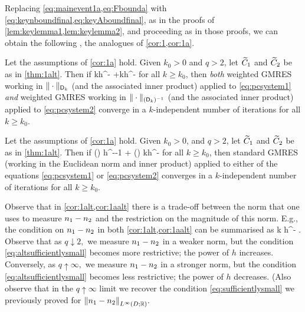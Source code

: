 Replacing \cref{eq:mainevent1a,eq:Fbounda} with \cref{eq:keynboundfinal,eq:keyAboundfinal}, as in the proofs of \cref{lem:keylemma1,lem:keylemma2}, and proceeding as in those proofs, we can obtain the following , the analogues of \cref{cor:1,cor:1a}.

\label{cor:1alt}
Let the assumptions of \cref{cor:1a} hold.  Given $k_0>0$ and $q >2$, let $\widetilde{C}_{1}$ and $\widetilde{C}_{2}$ be as in \cref{thm:1alt}. Then if 
\beq\label{eq:condalt}
\Cotilde kh^{-} \NLqDRRdtd{\Aso-\Ast} +\Cttilde  kh^{-} \NLqDRR{\nso-\nst}
\leq {}
\eeq
for all $k\geq k_0$, then \emph{both} weighted GMRES working in $\|\cdot\|_{\mathsf{D}_k}$ (and the associated inner product) applied to \cref{eq:pcsystem1} \emph{and} weighted GMRES working in $\|\cdot\|_{(\mathsf{D}_k)^{-1}}$ (and the associated inner product) applied to \cref{eq:pcsystem2}  converge in a $k$-independent number of iterations for all $k\geq k_0$.
\enth

\label{cor:1aalt}
Let the assumptions of \cref{cor:1a} hold.  Given $k_0>0$, and $q >2$, let $\widetilde{C}_{1}$ and $\widetilde{C}_{2}$ be as in \cref{thm:1alt}. Then if 
\beq\label{eq:condaalt}
\Cotilde \mleft(\frac{\splus}{\mminus}\mright) h^{--1} \NLqDRRdtd{\Aso-\Ast} + \Cttilde \mleft(\frac{\mplus}{\mminus}\mright) kh^{-} \NLqDRR{\nso-\nst} \leq \half
\eeq
for all $k\geq k_0$, then standard GMRES (working in the Euclidean norm and inner product) applied to either of the equations \cref{eq:pcsystem1} or \cref{eq:pcsystem2}
 converges in a $k$-independent number of iterations for all $k\geq k_0$.
\enth

Observe that in \cref{cor:1alt,cor:1aalt} there is a trade-off between the norm that one uses to measure $n_{1}-n_{2}$ and the restriction on the magnitude of this norm. E.g., the condition on $n_{1}-n_{2}$ in both \cref{cor:1alt,cor:1aalt} can be summarised as
\beq\label{eq:altsufficientlysmall}
\NLqDRR{\no-\nt} k h^{-} .
\eeq
Observe that as $q \downarrow 2,$ we measure $n_{1}-n_{2}$ in a weaker norm, but the condition \cref{eq:altsufficientlysmall} becomes more restrictive; the power of $h$ increases. Conversely, as $q \uparrow \infty,$ we measure $n_{1}-n_{2}$ in a stronger norm, but the condition \cref{eq:altsufficientlysmall} becomes less restrictive; the power of $h$ decreases. (Also observe that in the $q\uparrow\infty$ limit we recover the condition \cref{eq:sufficientlysmall} we previously proved for $\NLiDRR{\no-\nt}.$
\ere

